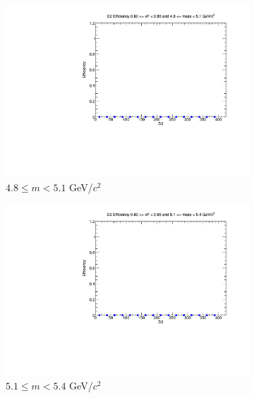 \begin{figure}[p]
\begin{subfigure}[b]{0.32\textwidth}
        \centering
        \includegraphics[width=\textwidth]{./kTrackerEfficiencyPlots/D2_Efficiency_xF16_mass2.pdf}
        \caption{$4.8 \leq m < 5.1$ GeV/$c^2$}
        \label{fig:xF16_mass2}
    \end{subfigure}
    \vspace{0.5cm}
    \begin{subfigure}[b]{0.32\textwidth}
        \centering
        \includegraphics[width=\textwidth]{./kTrackerEfficiencyPlots/D2_Efficiency_xF16_mass3.pdf}
        \caption{$5.1 \leq m < 5.4$ GeV/$c^2$}
        \label{fig:xF16_mass3}
    \end{subfigure}
    \hfill
    \begin{subfigure}[b]{0.32\textwidth}
        \centering

\end{subfigure}
\end{figure}

